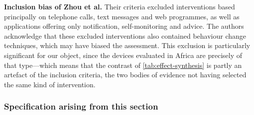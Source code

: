 \documentclass[12pt,a4paper,oneside]{report}
\begin{document}
\textbf{Inclusion bias of Zhou et al.} Their criteria excluded interventions based principally on telephone calls, text messages and web programmes, as well as applications offering only notification, self-monitoring and advice. The authors acknowledge that these excluded interventions also contained behaviour change techniques, which may have biased the assessment. This exclusion is particularly significant for our object, since the devices evaluated in Africa are precisely of that type---which means that the contrast of \cref{tab:effect-synthesis} is partly an artefact of the inclusion criteria, the two bodies of evidence not having selected the same kind of intervention.

\subsubsection{Specification arising from this section}
\end{document}
